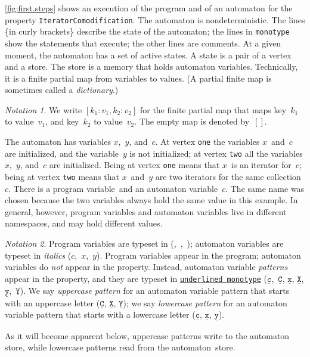 \documentclass{sigplanconf} %
\newcommand{\pattern}[1]{\ensuremath{\mathtt{\underline{#1}}}}
\theoremstyle{definition}
\theoremstyle{remark}
\newtheorem{notation}{Notation}
\begin{document}
\autoref{fig:first.steps} shows an execution of the program and of an automaton for the property \texttt{IteratorComodification}.
The automaton is nondeterministic.
The lines \{in curly brackets\} describe the state of the automaton;
the lines in \texttt{monotype} show the statements that execute;
the other lines are comments.
At a given moment, the automaton has a set of active states.
A state is a pair of a vertex and a store.
The store is a memory that holds automaton variables.
Technically, it is a finite partial map from variables to values.
(A partial finite map is sometimes called a \emph{dictionary}.)

\begin{notation}
We write $[k_1:v_1,k_2:v_2]$ for the finite partial map that maps key~$k_1$ to value~$v_1$, and key~$k_2$ to value~$v_2$.
The empty map is denoted by~$[]$.
\end{notation}

The automaton has variables $x$,~$y$, and~$c$.
At vertex \texttt{one} the variables $x$~and~$c$ are initialized, and the variable~$y$ is not initialized;
at vertex \texttt{two} all the variables $x$,~$y$, and~$c$ are initialized.
Being at vertex \texttt{one} means that $x$~is an iterator for~$c$;
being at vertex \texttt{two} means that $x$~and~$y$ are two iterators for the same collection~$c$.
There is a program variable~\Verb@c@ and an automaton variable~$c$.
The same name was chosen because the two variables always hold the same value in this example.
In general, however, program variables and automaton variables live in different namespaces, and may hold different values.

\begin{notation}
Program variables are typeset in \Verb@monotype@ (\Verb@c@,~\Verb@i@,~\Verb@j@);
automaton variables are typeset in \textit{italics} ($c$,~$x$,~$y$).
Program variables appear in the program;
automaton variables do \emph{not} appear in the property.
Instead, automaton variable \emph{patterns} appear in the property, and they are typeset in \texttt{\underline{underlined monotype}} (\pattern c,~\pattern C, \pattern x, \pattern X, \pattern y,~\pattern Y).
We say \emph{uppercase pattern} for an automaton variable pattern that starts with an uppercase letter (\pattern C, \pattern X, \pattern Y);
we say \emph{lowercase pattern} for an automaton variable pattern that starts with a lowercase letter (\pattern c, \pattern x, \pattern y).
\end{notation}

As it will become apparent below, uppercase patterns write to the automaton store, while lowercase patterns read from the automaton~store.
\end{document}
